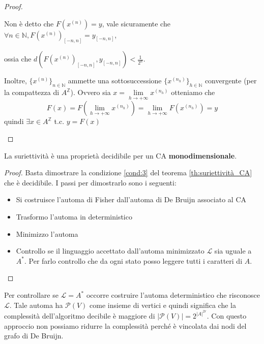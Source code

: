 \begin{teorema}
\begin{proof}
\begin{itemize}
                  Non è detto che $F(x^{(n)})=y$, vale sicuramente che $\forall n \in \mathbb{N},F(x^{(n)})_{[-n,n]}=y_{[-n,n]}$,
                  
                  ossia che $d(F(x^{(n)})_{[-n,n]},y_{[-n,n]})< \frac{1}{2^n}$.

                  Inoltre, $\{x^{(n)}\}_{n\in \mathbb{N}}$ ammette una sottosuccessione
                  $\{x^{(n_h)}\}_{h\in \mathbb{N}}$ convergente (per la compattezza di $A^{\mathbb{Z}}$).
                  Ovvero sia $x= \lim\limits_{h\rightarrow +\infty}x ^{(n_h)}$ otteniamo  che $$ F(x)= F(\lim\limits_{h\rightarrow +\infty}x ^{(n_h)}) = \lim\limits_{h\rightarrow +\infty} F(x^{(n_h)})=y$$
                  quindi $\exists x \in A^\mathbb{Z}$ t.c. $y = F(x)$
        \end{itemize}
    \end{proof}
\end{teorema}

\begin{teorema}
    La suriettività è una proprietà decidibile per un CA \textbf{monodimensionale}.
    \begin{proof}
        Basta dimostrare la condizione \ref{cond:3} del teorema \ref{th:suriettività_CA}
        che è decidibile. I passi per dimostrarlo sono i seguenti:
        \begin{itemize}
            \item Si costruisce l'automa di Fisher dall'automa di De Bruijn associato al CA
            \item Trasformo l'automa in deterministico
            \item Minimizzo l'automa
            \item Controllo se il linguaggio accettato dall'automa minimizzato $\mathcal{L}$ sia
                  uguale a $A^\ast$. Per farlo controllo che da ogni stato posso leggere
                  tutti i caratteri di $A$.
        \end{itemize}
    \end{proof}
\end{teorema}
\begin{nota}
    Per controllare se $\mathcal{L} = A^\ast$ occorre costruire l'automa deterministico
    che risconosce $ \mathcal{L}$. Tale automa ha $\mathcal{P}(V)$ come insieme di
    vertici e quindi significa che la complessità dell'algoritmo decibile è maggiore
    di $|\mathcal{P}(V)| = 2^{|A|^{2r}}$. Con questo approccio non possiamo ridurre
    la complessità perché è vincolata dai nodi del grafo di De Bruijn.
\end{nota}

